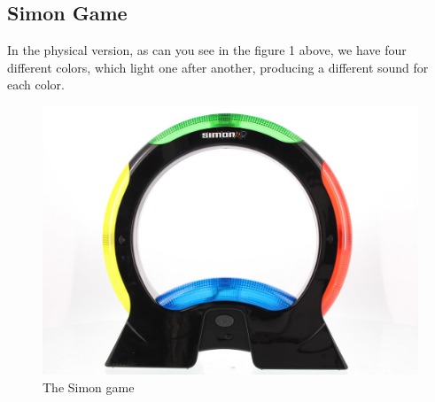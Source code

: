 \documentclass[12pt, openany, twocolumn]{article}
\begin{document}



    \subsection{Simon Game}
    In the physical version, as can you see in the figure 1 above, we have four different colors, which light one after another, producing a different sound for each color.
    \\

    \begin{figure}
    \includegraphics[scale=0.185]{simon.jpg}
    \caption{The Simon game}
    \end{figure}
    
\end{document}
